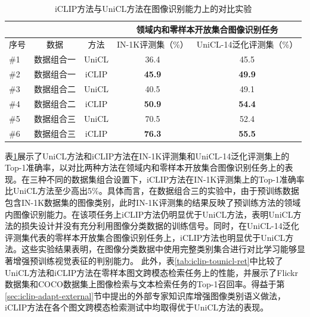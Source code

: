 \begin{table}
    \centering
    \caption{iCLIP方法与UniCL方法在图像识别能力上的对比实验}
    \begin{tabular}{lcccc}
    \toprule
        \multicolumn{1}{c}{} &
        \multicolumn{1}{c}{} & \multicolumn{1}{c}{} & \multicolumn{2}{c}{领域内和零样本开放集合图像识别任务} \\
        \midrule
        序号 & 数据 & 方法 & IN-1K评测集（\%） & UniCL-14泛化评测集（\%）   \\
        \midrule
        \#1 & 数据组合一 & UniCL & 36.4 & 45.5 \\  
        \#2 & 数据组合一 & iCLIP & \textbf{45.9} & \textbf{49.9} \\  

        \midrule
        
        \#3 & 数据组合二 & UniCL & 40.5 & 49.1 \\
        \#4 & 数据组合二 & iCLIP & \textbf{50.9} & \textbf{54.4} \\   

        \midrule
        
        \#5 & 数据组合三 & UniCL & 70.5  & 52.4 \\
        \#6 & 数据组合三 & iCLIP & \textbf{76.3} & \textbf{55.5} \\

        \bottomrule
    \end{tabular}
    \label{tab:iclip-tounicl}
\end{table}

表\ref{tab:iclip-tounicl}展示了UniCL方法和iCLIP方法在IN-1K评测集和UniCL-14泛化评测集上的Top-1准确率，以对比两种方法在领域内和零样本开放集合图像识别任务上的表现。在三种不同的数据集组合设置下，iCLIP方法在IN-1K评测集上的Top-1准确率比UniCL方法至少高出5\%。具体而言，在数据组合三的实验中，由于预训练数据包含IN-1K数据集的图像类别，此时IN-1K评测集的结果反映了预训练方法的领域内图像识别能力。在该项任务上iCLIP方法仍明显优于UniCL方法，表明UniCL方法的损失设计并没有充分利用图像分类数据的训练信号。同时，在UniCL-14泛化评测集代表的零样本开放集合图像识别任务上，iCLIP方法也明显优于UniCL方法。这些实验结果表明，在图像分类数据中使用完整类别集合进行对比学习能够显著增强预训练视觉表征的判别能力。
此外，表\ref{tab:iclip-tounicl-ret}中比较了UniCL方法和iCLIP方法在零样本图文跨模态检索任务上的性能，并展示了Flickr数据集和COCO数据集上图像检索与文本检索任务的Top-1召回率。得益于第\ref{sec:iclip-adapt-external}节中提出的外部专家知识库增强图像类别语义做法，iCLIP方法在各个图文跨模态检索测试中均取得优于UniCL方法的表现。



